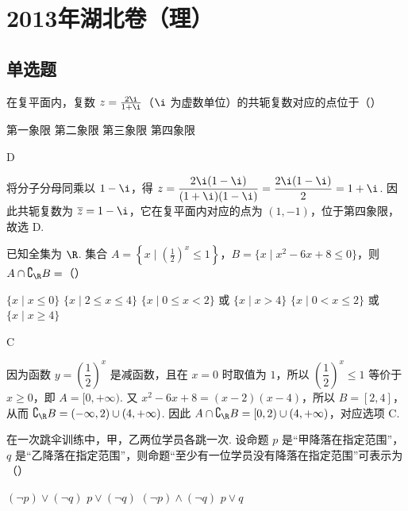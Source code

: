 \chapter{2013年湖北卷（理）}

\section{单选题}

\begin{problem}
在复平面内，复数 \(z = \frac{2\i}{1 + \i}\)（\(\i\) 为虚数单位）的共轭复数对应的点位于（\quad）

\choices
    {第一象限}
    {第二象限}
    {第三象限}
    {第四象限}
\end{problem}

\begin{answer}
D
\end{answer}

\begin{solution}
将分子分母同乘以 \(1-\i\)，得
\(z=\dfrac{2\i(1-\i)}{(1+\i)(1-\i)}=\dfrac{2\i(1-\i)}{2}=1+\i\).
因此共轭复数为 \(\overline{z}=1-\i\)，它在复平面内对应的点为 \((1,-1)\)，位于第四象限，故选 D.
\end{solution}

\begin{problem}
已知全集为 \(\R\). 集合 \(A = \left\{x \mid \left(\frac{1}{2}\right)^x \leqslant 1\right\}\)，\(B = \{x \mid x^2 - 6x + 8 \leqslant 0\}\)，则 \(A \cap \complement_{\R} B =\)（\quad）

\choices
    {\(\{x \mid x \leqslant 0\}\)}
    {\(\{x \mid 2 \leqslant x \leqslant 4\}\)}
    {\(\{x \mid 0 \leqslant x < 2\}\) 或 \(\{x \mid x > 4\}\)}
    {\(\{x \mid 0 < x \leqslant 2\}\) 或 \(\{x \mid x \geqslant 4\}\)}
\end{problem}

\begin{answer}
C
\end{answer}

\begin{solution}
因为函数 \(y=\left(\dfrac12\right)^x\) 是减函数，且在 \(x=0\) 时取值为 \(1\)，所以 \(\left(\dfrac12\right)^x\leqslant1\) 等价于 \(x\geqslant0\)，即 \(A=[0,+\infty)\).
又 \(x^2-6x+8=(x-2)(x-4)\)，所以 \(B=[2,4]\)，从而 \(\complement_{\R}B=(-\infty,2)\cup(4,+\infty)\).
因此
\(A\cap\complement_{\R}B=[0,2)\cup(4,+\infty)\)，对应选项 C.
\end{solution}

\begin{problem}
在一次跳伞训练中，甲，乙两位学员各跳一次. 设命题 \(p\) 是“甲降落在指定范围”，\(q\) 是“乙降落在指定范围”，则命题“至少有一位学员没有降落在指定范围”可表示为（\quad）

\choices
    {\((\neg p) \vee (\neg q)\)}
    {\(p \vee (\neg q)\)}
    {\((\neg p) \wedge (\neg q)\)}
    {\(p \vee q\)}
\end{problem}

